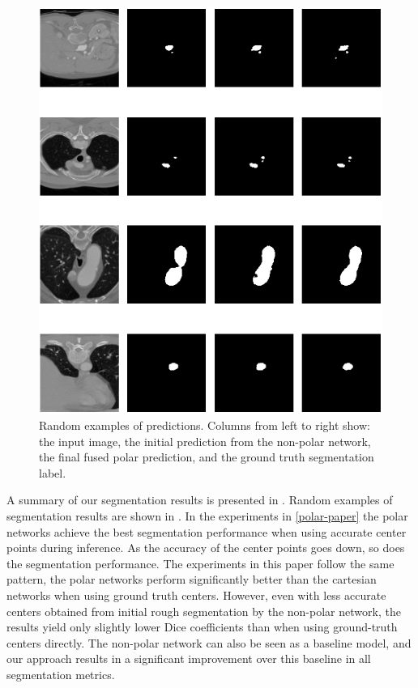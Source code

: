 \begin{figure}[h!]
\centering
\includegraphics[width=\columnwidth]{images/4/examples_3}
\caption{Random examples of predictions. Columns from left to right show: the input image, the initial prediction from the non-polar network, the final fused polar prediction, and the ground truth segmentation label. \cite{bencevicUsingPolarTransform2022a}}
\label{fig:examples}
\end{figure}

A summary of our segmentation results is presented in . Random examples of segmentation results are shown in . In the experiments in \ref{polar-paper} the polar networks achieve the best segmentation performance when using accurate center points during inference. As the accuracy of the center points goes down, so does the segmentation performance. The experiments in this paper follow the same pattern, the polar networks perform significantly better than the cartesian networks when using ground truth centers. However, even with less accurate centers obtained from initial rough segmentation by the non-polar network, the results yield only slightly lower Dice coefficients than when using ground-truth centers directly. The non-polar network can also be seen as a baseline model, and our approach results in a significant improvement over this baseline in all segmentation metrics.

